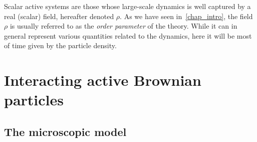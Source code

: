 
Scalar active systems are those whose large-scale dynamics is well captured by a real (scalar) field, hereafter denoted $\rho$. 
As we have seen in~\autoref{chap_intro}, the field $\rho$ is usually referred to as the \emph{order parameter} of the theory.
While it can in general represent various quantities related to the dynamics, here it will be most of time given by the particle density.





\section{Interacting active Brownian particles}

\subsection{The microscopic model}

